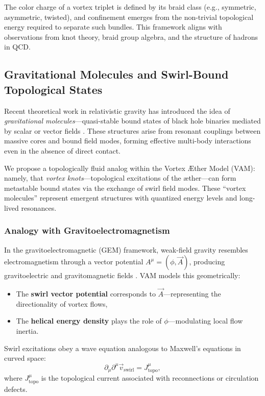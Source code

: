 The color charge of a vortex triplet is defined by its braid class (e.g., symmetric, asymmetric, twisted), and confinement emerges from the non-trivial topological energy required to separate such bundles. This framework aligns with observations from knot theory, braid group algebra, and the structure of hadrons in QCD.

\subsection{Gravitational Molecules and Swirl-Bound Topological States}

Recent theoretical work in relativistic gravity has introduced the idea of \textit{gravitational molecules}—quasi-stable bound states of black hole binaries mediated by scalar or vector fields \cite{baumann2023black}. These structures arise from resonant couplings between massive cores and bound field modes, forming effective multi-body interactions even in the absence of direct contact.

We propose a topologically fluid analog within the Vortex Æther Model (VAM): namely, that \textit{vortex knots}—topological excitations of the æther—can form metastable bound states via the exchange of swirl field modes. These ``vortex molecules'' represent emergent structures with quantized energy levels and long-lived resonances.

\subsubsection*{Analogy with Gravitoelectromagnetism}

In the gravitoelectromagnetic (GEM) framework, weak-field gravity resembles electromagnetism through a vector potential $A^\mu = (\phi, \vec{A})$, producing gravitoelectric and gravitomagnetic fields \cite{mashhoon2001gravito}. VAM models this geometrically:
\begin{itemize}
    \item The \textbf{swirl vector potential} corresponds to $\vec{A}$—representing the directionality of vortex flows,
    \item The \textbf{helical energy density} plays the role of $\phi$—modulating local flow inertia.
\end{itemize}

Swirl excitations obey a wave equation analogous to Maxwell's equations in curved space:
\begin{equation}
\partial_\mu \partial^\mu \vec{v}_\text{swirl} = J^\mu_{\text{topo}},
\end{equation}
where $J^\mu_{\text{topo}}$ is the topological current associated with reconnections or circulation defects.

